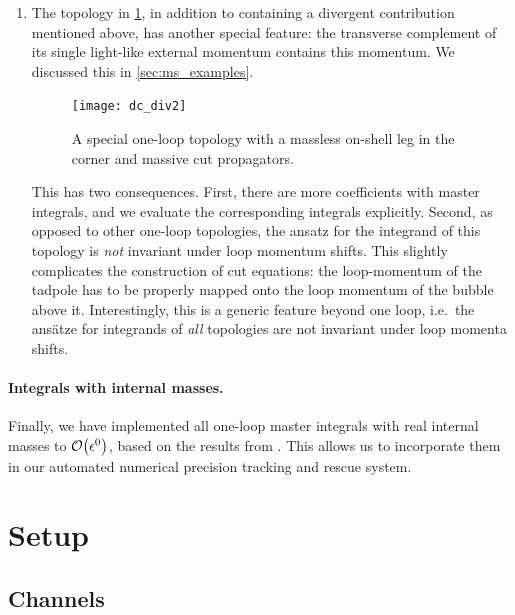 \begin{enumerate}
  \item The topology in \cref{fig:dc_div2}, in addition to containing a divergent contribution mentioned above,
    has another special feature: the transverse complement of its single light-like external momentum contains this momentum.
    We discussed this in \cref{sec:ms_examples}.
    \begin{figure}[h]
      \centering
      \texttt{[image: dc\_div2]}
      \caption{A special one-loop topology with a massless on-shell leg in the corner and massive cut propagators.}
      \label{fig:dc_div2}
    \end{figure}
    This has two consequences. First, there are more coefficients with master integrals, and we evaluate the corresponding integrals explicitly.
    Second, as opposed to other one-loop topologies, the ansatz for the integrand of this topology is \emph{not} invariant under loop momentum shifts.
    This slightly complicates the construction of cut equations:
    the loop-momentum of the tadpole has to be properly mapped onto the loop momentum of the bubble above it.
    Interestingly, this is a generic feature beyond one loop, i.e.\ the ansätze for integrands of \emph{all} topologies are not invariant under loop momenta shifts.
\end{enumerate}


\paragraph{Integrals with internal masses.} Finally,
we have implemented all one-loop master integrals with real internal masses to $\order{\epsilon^0} $, based
on the results from \cite{Carrazza:2016gav,vanHameren:2010cp}. This allows us to incorporate
them in our automated numerical precision tracking and rescue system.


\section{Setup}
\label{sec:wbb:setup}

\subsection{Channels}
\label{sec:calcsetup}

